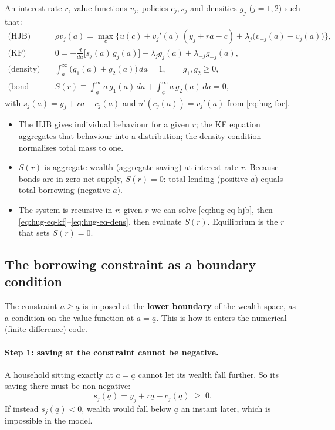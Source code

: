 \begin{keybox}[title=Huggett stationary equilibrium]
An interest rate $r$, value functions $v_j$, policies $c_j,s_j$ and densities $g_j$ ($j=1,2$) such that:
\begin{align}
  \text{(HJB)}\quad & \rho v_j(a) = \max_c\Big\{u(c) + v_j'(a)\,(y_j+ra-c) + \lambda_j\big(v_{-j}(a)-v_j(a)\big)\Big\},\label{eq:hug-eq-hjb}\\
  \text{(KF)}\quad & 0 = -\frac{d}{da}\big[s_j(a)\,g_j(a)\big] - \lambda_j g_j(a) + \lambda_{-j}g_{-j}(a),\label{eq:hug-eq-kf}\\
  \text{(density)}\quad & \int_{\underline a}^\infty \big(g_1(a)+g_2(a)\big)\,da = 1,\qquad g_1,g_2\ge 0,\label{eq:hug-eq-dens}\\
  \text{(bond market)}\quad & S(r) \equiv \int_{\underline a}^\infty a\,g_1(a)\,da + \int_{\underline a}^\infty a\,g_2(a)\,da = 0,\label{eq:hug-eq-mkt}
\end{align}
with $s_j(a)=y_j+ra-c_j(a)$ and $u'(c_j(a))=v_j'(a)$ from \eqref{eq:hug-foc}.
\end{keybox}
\begin{itemize}
  \item The HJB gives individual behaviour for a given $r$; the KF equation aggregates that behaviour into a distribution; the density condition normalises total mass to one.
  \item $S(r)$ is aggregate wealth (aggregate saving) at interest rate $r$. Because bonds are in zero net supply, $S(r)=0$: total lending (positive $a$) equals total borrowing (negative $a$).
  \item The system is recursive in $r$: given $r$ we can solve \eqref{eq:hug-eq-hjb}, then \eqref{eq:hug-eq-kf}--\eqref{eq:hug-eq-dens}, then evaluate $S(r)$. Equilibrium is the $r$ that sets $S(r)=0$.
\end{itemize}

\subsection{The borrowing constraint as a boundary condition }

The constraint $a\ge\underline a$ is imposed at the \textbf{lower boundary} of the wealth space, as a condition on the value function at $a=\underline a$. This is how it enters the numerical (finite-difference) code.

\paragraph{Step 1: saving at the constraint cannot be negative.}
A household sitting exactly at $a=\underline a$ cannot let its wealth fall further. So its saving there must be non-negative:
\begin{equation}\label{eq:bc-saving}
  s_j(\underline a) = y_j + r\underline a - c_j(\underline a) \;\ge\; 0 .
\end{equation}
If instead $s_j(\underline a)<0$, wealth would fall below $\underline a$ an instant later, which is impossible in the model.

